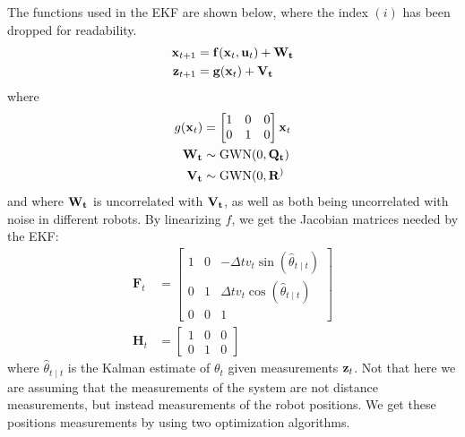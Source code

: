 The functions used in the EKF are shown below, where the index $(i)$ has been dropped for readability. 
\begin{align}
    \mathbf{x}_{t+1} &= \f(\mathbf{x}_t, \totu) + \W \\
    \totmeas[t+1] &= \g(\totstate) + \V
\end{align}
where
\begin{align}
    g(\totstate) &= \begin{bmatrix}
        1 & 0 & 0 \\
        0 & 1 & 0
    \end{bmatrix} \totstate \\
    \W &\sim \text{GWN} (0, \Q) \\
    \V &\sim \text{GWN} (0, \R) 
\end{align}
and where $\W$ is uncorrelated with $\V$, as well as both being uncorrelated with noise in different robots. By linearizing $f$, we get the Jacobian matrices needed by the EKF:
\begin{align}
    \mathbf{F}_t &=\begin{bmatrix}
        1 & 0 & -\Delta t v_{t} \sin(\hat{\theta}_{t \mid t}) \\
        0 & 1 & \Delta t v_{t} \cos(\hat{\theta}_{t \mid t}) \\
        0 & 0 & 1
    \end{bmatrix} \\
    \mathbf{H}_t &= \begin{bmatrix}
        1 & 0 & 0 \\
        0 & 1 & 0
    \end{bmatrix}
\end{align}
where $\hat{\theta}_{t \mid t}$ is the Kalman estimate of $\theta_t$ given measurements $\totmeas$. Not that here we are assuming that the measurements of the system are not distance measurements, but instead measurements of the robot positions. We get these positions measurements by using two optimization algorithms.


